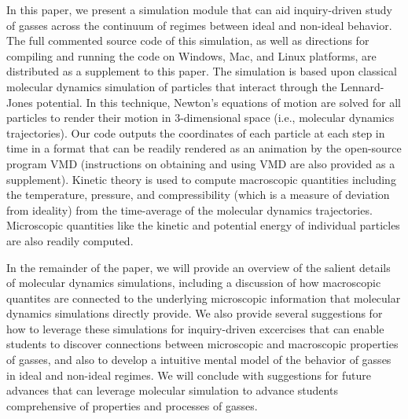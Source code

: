 \documentclass[journal=jpclcd,manuscript=article]{achemso}
\begin{document}
In this paper, we present a simulation module that can aid inquiry-driven study of gasses across
the continuum of regimes between ideal and non-ideal behavior.  The full commented source code of this simulation,
as well as directions for compiling and running the code on Windows, Mac, and Linux platforms, are distributed as a supplement
to this paper.  The simulation is based upon classical molecular dynamics
simulation of particles that interact through the Lennard-Jones potential.  In this technique, Newton's equations of motion 
are solved for all particles to render their motion in 3-dimensional space (i.e., molecular dynamics trajectories).  Our code outputs the coordinates
of each particle at each step in time in a format that can be readily rendered as an animation by the open-source program
VMD (instructions on obtaining and using VMD are also provided as a supplement).  Kinetic theory is used to
compute macroscopic quantities including the temperature, pressure, and compressibility (which is a measure
of deviation from ideality) from the time-average of the molecular dynamics trajectories.  Microscopic quantities like the kinetic
and potential energy of individual particles are also readily computed.  

In the remainder of the paper, we will provide an overview of the salient details of molecular dynamics simulations, including
a discussion of how macroscopic quantites are connected to the underlying microscopic information that molecular dynamics simulations directly provide.  We also provide 
several suggestions for how to leverage these simulations for inquiry-driven excercises that can enable students to discover
connections between microscopic and macroscopic properties of gasses, and also to develop a intuitive mental 
model of the behavior of gasses in ideal and non-ideal regimes.  We will conclude with suggestions for future advances
that can leverage molecular simulation to advance students comprehensive of properties and processes of gasses.  
\end{document}
